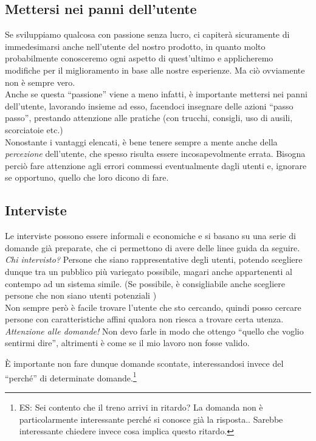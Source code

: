 \documentclass[oneside]{book}
\begin{document}
		\subsection{Mettersi nei panni dell'utente}
			Se sviluppiamo qualcosa con passione senza lucro, ci capiterà sicuramente di immedesimarsi anche nell'utente del nostro prodotto, in quanto molto probabilmente conosceremo ogni aspetto di quest'ultimo e applicheremo modifiche per il miglioramento in base alle nostre esperienze. Ma ciò ovviamente non è sempre vero. \\

			Anche se questa ``passione'' viene a meno infatti, è importante mettersi nei panni dell'utente, lavorando insieme ad esso, facendoci insegnare delle azioni ``passo passo'', prestando attenzione alle pratiche (con trucchi, consigli, uso di ausili, scorciatoie etc.) \\

			Nonostante i vantaggi elencati, è bene tenere sempre a mente anche della \emph{percezione} dell'utente, che spesso risulta essere incosapevolmente errata. Bisogna perciò fare attenzione agli errori commessi eventualmente dagli utenti e, ignorare se opportuno, quello che loro dicono di fare. 

		\subsection{Interviste} \label{Interviste}
			Le interviste possono essere informali e economiche e si basano su una serie di domande già preparate, che ci permettono di avere delle linee guida da seguire. \\

			\emph{Chi intervisto?} Persone che siano rappresentative degli utenti, potendo scegliere dunque tra un pubblico più variegato possibile, magari anche appartenenti al contempo ad un sistema simile. (Se possibile, è consigliabile anche scegliere persone che non siano utenti potenziali ) \\
			Non sempre però è facile trovare l'utente che sto cercando, quindi posso cercare persone con caratteristiche affini qualora non riesca a trovare certa utenza. \\

			\emph{Attenzione alle domande!} Non devo farle in modo che ottengo ``quello che voglio sentirmi dire'', altrimenti è come se il mio lavoro non fosse valido.

			È importante non fare dunque domande scontate, interessandosi invece del ``perché'' di determinate domande.\footnote{ ES: Sei contento che il treno arrivi in ritardo? La domanda non è particolarmente interessante perché si conosce già la risposta.. Sarebbe interessante chiedere invece cosa implica questo ritardo.}\\ 
\end{document}
